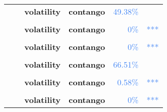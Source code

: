\documentclass[
  authoryear,
  preprint,
  3p]{elsarticle}
\begin{document}
\begin{longtable}[t]{>{}l>{}l>{}l>{}l>{}r>{}r}
\textbf{} & \textbf{} & \textbf{volatility} & \textbf{contango} & \textcolor[HTML]{4285f4}{49.38\%} & \textcolor[HTML]{4285f4}{}\\
\textbf{\cellcolor{gray!10}{}} & \textbf{\cellcolor{gray!10}{crisis}} & \textbf{\cellcolor{gray!10}{mean}} & \textbf{\cellcolor{gray!10}{backwardation}} & \textcolor[HTML]{4285f4}{\cellcolor{gray!10}{95.55\%}} & \textcolor[HTML]{4285f4}{\cellcolor{gray!10}{}}\\
\textbf{} & \textbf{} & \textbf{volatility} & \textbf{contango} & \textcolor[HTML]{4285f4}{0\%} & \textcolor[HTML]{4285f4}{\vphantom{21} ***}\\
\textbf{\cellcolor{gray!10}{}} & \textbf{\cellcolor{gray!10}{post-crisis}} & \textbf{\cellcolor{gray!10}{mean}} & \textbf{\cellcolor{gray!10}{backwardation}} & \textcolor[HTML]{4285f4}{\cellcolor{gray!10}{18.99\%}} & \textcolor[HTML]{4285f4}{\cellcolor{gray!10}{}}\\
\addlinespace
\textbf{} & \textbf{} & \textbf{volatility} & \textbf{contango} & \textcolor[HTML]{4285f4}{0\%} & \textcolor[HTML]{4285f4}{\vphantom{20} ***}\\
\textbf{\cellcolor{gray!10}{Gasoline (XNYM)}} & \textbf{\cellcolor{gray!10}{past}} & \textbf{\cellcolor{gray!10}{mean}} & \textbf{\cellcolor{gray!10}{backwardation}} & \textcolor[HTML]{4285f4}{\cellcolor{gray!10}{18.96\%}} & \textcolor[HTML]{4285f4}{\cellcolor{gray!10}{}}\\
\textbf{} & \textbf{} & \textbf{volatility} & \textbf{contango} & \textcolor[HTML]{4285f4}{66.51\%} & \textcolor[HTML]{4285f4}{}\\
\textbf{\cellcolor{gray!10}{}} & \textbf{\cellcolor{gray!10}{financialisation}} & \textbf{\cellcolor{gray!10}{mean}} & \textbf{\cellcolor{gray!10}{contango}} & \textcolor[HTML]{4285f4}{\cellcolor{gray!10}{58.35\%}} & \textcolor[HTML]{4285f4}{\cellcolor{gray!10}{}}\\
\textbf{} & \textbf{} & \textbf{volatility} & \textbf{contango} & \textcolor[HTML]{4285f4}{0.58\%} & \textcolor[HTML]{4285f4}{***}\\
\addlinespace
\textbf{\cellcolor{gray!10}{}} & \textbf{\cellcolor{gray!10}{crisis}} & \textbf{\cellcolor{gray!10}{mean}} & \textbf{\cellcolor{gray!10}{backwardation}} & \textcolor[HTML]{4285f4}{\cellcolor{gray!10}{49.08\%}} & \textcolor[HTML]{4285f4}{\cellcolor{gray!10}{}}\\
\textbf{} & \textbf{} & \textbf{volatility} & \textbf{contango} & \textcolor[HTML]{4285f4}{0\%} & \textcolor[HTML]{4285f4}{\vphantom{19} ***}\\

\end{longtable}
\end{document}
